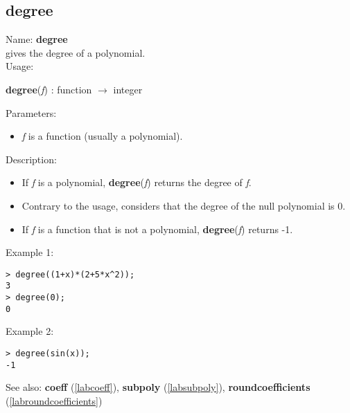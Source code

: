 \subsection{degree}
\label{labdegree}
\noindent Name: \textbf{degree}\\
gives the degree of a polynomial.\\
\noindent Usage: 
\begin{center}
\textbf{degree}(\emph{f}) : \textsf{function} $\rightarrow$ \textsf{integer}\\
\end{center}
Parameters: 
\begin{itemize}
\item \emph{f} is a function (usually a polynomial).
\end{itemize}
\noindent Description: \begin{itemize}

\item If \emph{f} is a polynomial, \textbf{degree}(\emph{f}) returns the degree of \emph{f}.

\item Contrary to the usage, \sollya considers that the degree of the null polynomial
   is 0.

\item If \emph{f} is a function that is not a polynomial, \textbf{degree}(\emph{f}) returns -1.
\end{itemize}
\noindent Example 1: 
\begin{center}\begin{minipage}{15cm}\begin{Verbatim}[frame=single]
> degree((1+x)*(2+5*x^2));
3
> degree(0);
0
\end{Verbatim}
\end{minipage}\end{center}
\noindent Example 2: 
\begin{center}\begin{minipage}{15cm}\begin{Verbatim}[frame=single]
> degree(sin(x));
-1
\end{Verbatim}
\end{minipage}\end{center}
See also: \textbf{coeff} (\ref{labcoeff}), \textbf{subpoly} (\ref{labsubpoly}), \textbf{roundcoefficients} (\ref{labroundcoefficients})
